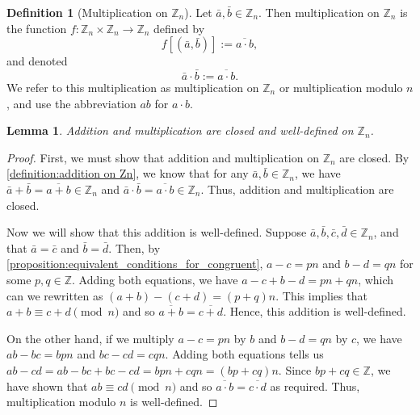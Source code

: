 \documentclass[10pt, titlepage]{amsart}
\newcommand\Z{{\mathbb Z}}
\newtheorem{lemma}{Lemma}[subsection]
\theoremstyle{definition}
\newtheorem{definition}{Definition}[subsection]
\begin{document}
	\begin{definition}[Multiplication on $\Z_n$]\label{definition:multiplication on Zn}
		Let $\bar{a}, \bar{b} \in \Z_n$.
		Then multiplication on $\Z_n$ is the function $f: \Z_n \times \Z_n \to \Z_n$ defined by $$f[(\bar{a}, \bar{b})] := \overline{a \cdot b},$$
		and denoted $$ \bar{a} \cdot \bar{b} := \overline{a \cdot b}.$$
		We refer to this multiplication as multiplication on $\Z_n$ or multiplication modulo $n$, and use the abbreviation $ab$ for $a \cdot b$.
	\end{definition}

	
	\begin{lemma}\label{proposition:add_and_mult_closed/well-defined}
		Addition and multiplication are closed and well-defined on $\Z_n$.
	\end{lemma}
	
	\begin{proof}
		First, we must show that addition and multiplication on $\Z_n$ are closed. By \cref{definition:addition on Zn}, we know that for any $\bar{a}, \bar{b} \in \Z_n$, we have $\bar{a} + \bar{b} = \overline{a + b} \in \Z_n$ and $\bar{a} \cdot \bar{b} = \overline{a \cdot b} \in \Z_n$. Thus, addition and multiplication are closed. 
		
		Now we will show that this addition is well-defined. Suppose $\bar{a},\bar{b},\bar{c},\bar{d} \in \Z_n$, and that $\bar{a} = \bar{c}$ and $\bar{b} = \bar{d}$. Then, by \cref{proposition:equivalent_conditions_for_congruent}, $a - c = pn$ and $b - d = qn$ for some $p,q \in \Z$. Adding both equations, we have $a - c + b - d = pn + qn$, which can we rewritten as $(a + b) - (c + d) = (p+q)n$. This implies that $a + b \equiv c + d \pmod n$ and so $\overline{a + b} = \overline{c + d}$. Hence, this addition is well-defined. 
		
		
		On the other hand, if we multiply $a-c = pn$ by $b$ and $b-d = qn$ by $c$, we have $ab-bc=bpn$ and $bc-cd=cqn$. Adding both equations tells us $ab-cd = ab-bc+bc-cd=bpn + cqn = (bp + cq)n$. Since $bp + cq \in \Z$, we have shown that $ab \equiv cd \pmod n$ and so $\overline{a \cdot b} = \overline{c \cdot d}$ as required. Thus, multiplication modulo $n$ is well-defined.
	\end{proof}
	
	
	
\end{document}
